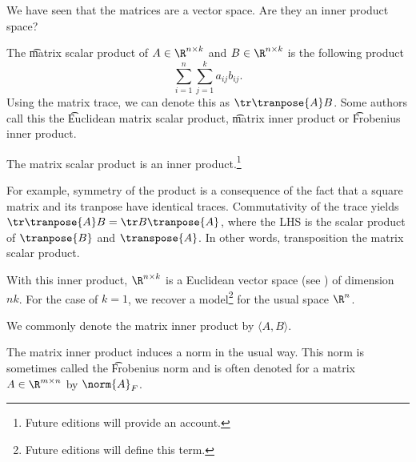 

We have seen that the matrices are a vector space.
Are they an inner product space?


The \t{matrix scalar product} of $A \in \R^{n \times k}$ and $B \in \R^{n \times k}$ is the following product
\[
  \sum_{i = 1}^{n} \sum_{j = 1}^{k} a_{ij}b_{ij}.
\]
Using the matrix trace, we can denote this as $\tr \tranpose{A} B$.
Some authors call this the \t{Euclidean matrix scalar product}, \t{matrix inner product} or \t{Frobenius inner product}.

\begin{proposition}
The matrix scalar product is an inner product.\footnote{Future editions will provide an account.}
\end{proposition}

For example, symmetry of the product is a consequence of the fact that a square matrix and its tranpose have identical traces.
Commutativity of the trace yields $\tr \tranpose{A} B = \tr B\tranpose{A}$, where the LHS is the scalar product of $\tranpose{B}$ and $\transpose{A}$.
In other words, transposition  the matrix scalar product.

With this inner product, $\R^{n \times k}$ is a Euclidean vector space (see ) of dimension $nk$.
For the case of $k = 1$, we recover a model\footnote{Future editions will define this term.} for the usual space $\R^n$.


We commonly denote the matrix inner product by $\langle A, B \rangle$.


The matrix inner product induces a norm in the usual way.
This norm is sometimes called the \t{Frobenius norm} and is often denoted for a matrix $A \in \R^{m \times n}$ by $\norm{A}_F$.
